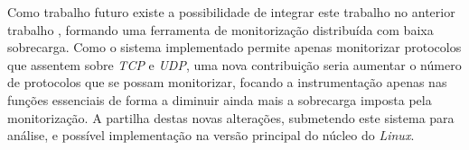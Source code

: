 \documentclass[a4paper]{llncs}
\begin{document}
Como trabalho futuro existe a possibilidade de integrar este trabalho no anterior trabalho \cite{Farruca:2009,duarte10}, formando uma ferramenta de monitorização distribuída com baixa sobrecarga. Como o sistema implementado permite apenas monitorizar protocolos que assentem sobre \textit{TCP} e \textit{UDP}, uma nova contribuição seria aumentar o número de protocolos que se possam monitorizar, focando a instrumentação apenas nas funções essenciais de forma a diminuir ainda mais a sobrecarga imposta pela monitorização. A partilha destas novas alterações, submetendo este sistema para análise, e possível implementação na versão principal do núcleo do \textit{Linux}.



\end{document}
